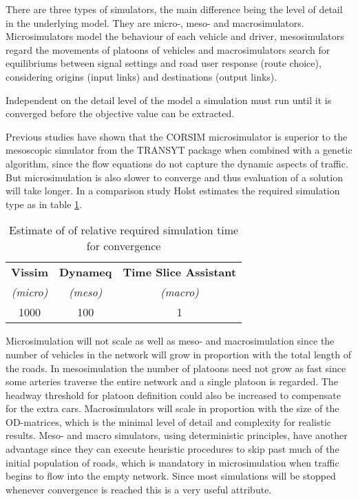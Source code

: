 There are three types of simulators, the main difference being the level of detail in the underlying model. They are micro-, meso- and macrosimulators. Microsimulators model the behaviour of each vehicle and driver, mesosimulators regard the movements of platoons of vehicles and macrosimulators search for equilibriums between signal settings and road user response (route choice), considering origins (input links) and destinations (output links).

Independent on the detail level of the model a simulation must run until it is converged before the objective value can be extracted. 

Previous studies have shown that the CORSIM microsimulator is superior to the mesoscopic simulator from the TRANSYT package when combined with a genetic algorithm, since the flow equations do not capture the dynamic aspects of traffic. But microsimulation is also slower to converge and thus evaluation of a solution will take longer. In a comparison study \cite{simcompare} Holst estimates the required simulation type as in table \ref{tab:convergespeed}.

\begin{table}[ht]
\centering
\begin{tabular}{c|c|c}
\textbf{Vissim} & \textbf{Dynameq} & \textbf{Time Slice Assistant} \\
\textit{(micro)} & \textit{(meso)} & \textit{(macro)} \\ \hline
1000 & 100 & 1
\end{tabular}
\caption{Estimate of of relative required simulation time for convergence}
\label{tab:convergespeed}
\end{table}

Microsimulation will not scale as well as meso- and macrosimulation since the number of vehicles in the network will grow in proportion with the total length of the roads. In mesosimulation the number of platoons need not grow as fast since some arteries traverse the entire network and a single platoon is regarded. The headway threshold for platoon definition could also be increased to compensate for the extra cars. Macrosimulators will scale in proportion with the size of the OD-matrices, which is the minimal level of detail and complexity for realistic results. 
Meso- and macro simulators, using deterministic principles, have another advantage since they can execute heuristic procedures to skip past much of the initial population of roads, which is mandatory in microsimulation when traffic begins to flow into the empty network. Since most simulations will be stopped whenever convergence is reached this is a very useful attribute.

